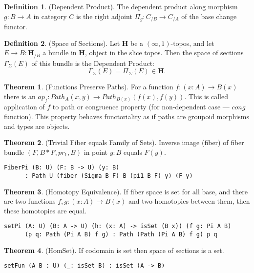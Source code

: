 \documentclass{article}
\theoremstyle{definition}
\newtheorem{definition}{Definition}
\newtheorem{theorem}{Theorem}
\begin{document}
\begin{definition} (Dependent Product).
The dependent product along morphism $g: B \rightarrow A$ in category $C$ is the right
adjoint $\Pi_g : C_{/B} \rightarrow C_{/A}$ of the base change functor.
\end{definition}

\begin{definition} (Space of Sections).
Let $\mathbf{H}$ be a $(\infty,1)$-topos, and let $E \rightarrow B : \mathbf{H}_{/B}$ a bundle in
$\mathbf{H}$, object in the slice topos. Then the space of sections $\Gamma_\Sigma(E)$
of this bundle is the Dependent Product:
$$ \Gamma_\Sigma(E) = \Pi_\Sigma (E) \in \mathbf{H}. $$
\end{definition}


\begin{theorem} (Functions Preserve Paths).
For a function $f: (x:A) \rightarrow B(x)$
there is an $ap_f : Path_A(x,y) \rightarrow Path_{B(x)}(f(x),f(y))$. This is called
application of $f$ to path or congruence property (for non-dependent case ---
$cong$ function). This property behaves functoriality
as if paths are groupoid morphisms and types are objects.
\end{theorem}

\begin{theorem} (Trivial Fiber equals Family of Sets).
Inverse image (fiber) of fiber bundle $(F,B*F,pr_1,B)$ in point $y:B$ equals $F(y)$.
\begin{lstlisting}
FiberPi (B: U) (F: B -> U) (y: B)
      : Path U (fiber (Sigma B F) B (pi1 B F) y) (F y)
\end{lstlisting}
\end{theorem}

\begin{theorem} (Homotopy Equivalence).
If fiber space is set for all base, and
there are two functions $f,g : (x:A) \rightarrow B(x)$ and two
homotopies between them, then these homotopies are equal.
\begin{lstlisting}
setPi (A: U) (B: A -> U) (h: (x: A) -> isSet (B x)) (f g: Pi A B)
      (p q: Path (Pi A B) f g) : Path (Path (Pi A B) f g) p q
\end{lstlisting}
\end{theorem}

\begin{theorem} (HomSet).
If codomain is set then space of sections is a set.
\begin{lstlisting}
setFun (A B : U) (_: isSet B) : isSet (A -> B)
\end{lstlisting}
\end{theorem}
\end{document}

